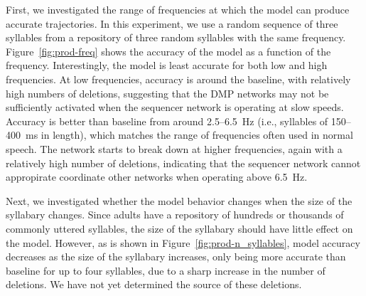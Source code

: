 First, we investigated the
range of frequencies at which the model
can produce accurate trajectories.
In this experiment, we use a random sequence
of three syllables from a
repository of three random syllables
with the same frequency.
Figure~\ref{fig:prod-freq} shows the accuracy
of the model as a function of the frequency.
Interestingly, the model is least accurate
for both low and high frequencies.
At low frequencies, accuracy is around
the baseline, with relatively high
numbers of deletions,
suggesting that the DMP networks
may not be sufficiently activated
when the sequencer network
is operating at slow speeds.
Accuracy is better than baseline
from around 2.5--6.5~Hz
(i.e., syllables of 150--400~ms in length),
which matches the range of frequencies
often used in normal speech.
The network starts to break down
at higher frequencies,
again with a relatively high number
of deletions, indicating that
the sequencer network
cannot appropirate coordinate
other networks when operating
above 6.5~Hz.


Next, we investigated whether the model
behavior changes when the size
of the syllabary changes.
Since adults have a repository
of hundreds or thousands
of commonly uttered syllables,
the size of the syllabary should have
little effect on the model.
However, as is shown in Figure~\ref{fig:prod-n_syllables},
model accuracy decreases
as the size of the syllabary increases,
only being more accurate than baseline
for up to four syllables,
due to a sharp increase
in the number of deletions.
We have not yet determined the source
of these deletions.


